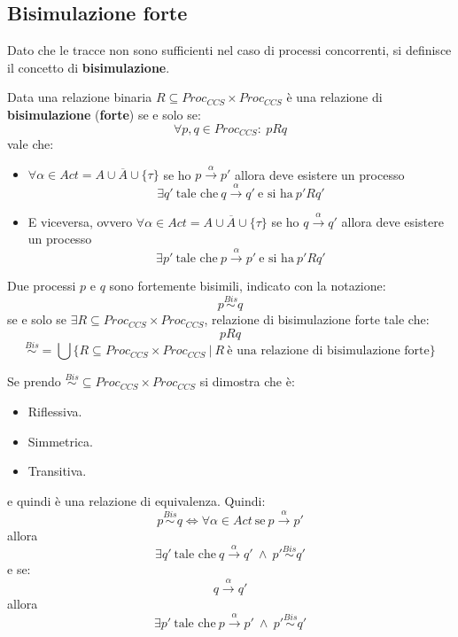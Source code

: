 \subsection{Bisimulazione forte}
Dato che le tracce non sono sufficienti nel caso di processi concorrenti, si definisce il concetto di \textbf{bisimulazione}. 
\begin{definizione}
    Data una relazione binaria $R \subseteq Proc_{CCS} \times Proc_{CCS}$ è una relazione di \textbf{bisimulazione} (\textbf{forte}) se e solo se: $$\forall p, q \in Proc_{CCS}: \ p R q$$ vale che: 
    \begin{itemize}
        \item $\forall \alpha \in Act = A \cup \overline{A} \cup \{\tau\}$ se ho $p \xrightarrow{\alpha} p'$ allora deve esistere un processo $$\exists q' \ \text{tale che} \ q \xrightarrow{\alpha} q' \ \text{e si ha} \ p'Rq'$$
        \item E viceversa, ovvero $\forall \alpha \in Act = A \cup \overline{A} \cup \{\tau\}$ se ho $q \xrightarrow{\alpha} q'$ allora deve esistere un processo $$\exists p' \ \text{tale che} \ p \xrightarrow{\alpha} p' \ \text{e si ha} \ p'Rq'$$
    \end{itemize}
    Due processi $p$ e $q$ sono fortemente bisimili, indicato con la notazione: $$p \stackrel{Bis}{\sim} q$$ se e solo se $\exists R \subseteq Proc_{CCS} \times Proc_{CCS}$, relazione di bisimulazione forte tale che: $$p R q$$ $$\stackrel{Bis}{\sim} = \bigcup \{R \subseteq Proc_{CCS} \times Proc_{CCS} \ | \ R \ \text{è una relazione di bisimulazione forte}\}$$
\end{definizione}
\begin{teorema}
    Se prendo $\stackrel{Bis}{\sim}  \subseteq Proc_{CCS} \times Proc_{CCS}$ si dimostra che è:
    \begin{itemize}
        \item Riflessiva.
        \item Simmetrica.
        \item Transitiva.
    \end{itemize}
    e quindi è una relazione di equivalenza. Quindi: $$p \stackrel{Bis}{\sim} q \Longleftrightarrow \forall \alpha \in Act \ \text{se} \ p \xrightarrow{\alpha} p'$$ allora $$\exists q' \ \text{tale che} \ q \xrightarrow{\alpha} q' \ \land \ p' \stackrel{Bis}{\sim} q'$$ e se: $$q \xrightarrow{\alpha} q'$$ allora $$\exists p' \ \text{tale che} \ p \xrightarrow{\alpha} p' \ \land \ p' \stackrel{Bis}{\sim} q'$$ 
\end{teorema}
